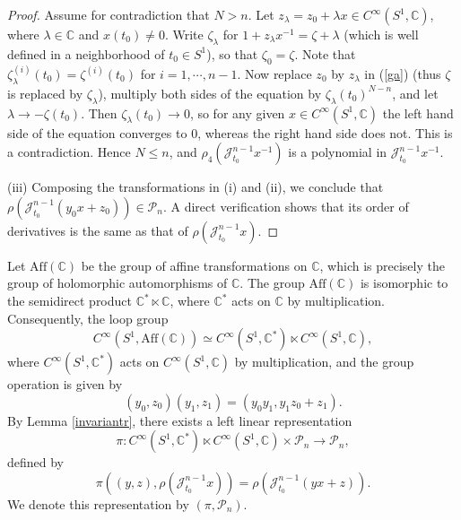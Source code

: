 \documentclass[11pt]{amsart}
\numberwithin{equation}{section}
\newcommand{\di}{\displaystyle}
\newcommand{\bc}{\mathbb{C}}
\newcommand{\sjm}{\mathscr{J}^{n-1}_{t_0}}
\newcommand{\cisoc}{C^{\infty}\left(S^1, \mathbb{C} \right)}
\newcommand{\cisoca}{C^{\infty}\left(S^1, \mathbb{C}^{\ast} \right)}
\newcommand{\pn}{\mathscr{P}_{n}}
\newcommand{\aff}{\mathrm{Aff}(\mathbb{C})}
\begin{document}
\begin{proof}
  Assume for contradiction that $N>n$.
  Let $z_{\lambda}=z_0+\lambda x \in \cisoc$, where $\lambda \in \bc$ and $x(t_0) \not=0$.
  Write $\zeta_{\lambda}$ for $1+z_{\lambda} x^{-1}=\zeta+\lambda$ (which is
  well defined in a neighborhood of $t_0 \in S^1$), so that $\zeta_0=\zeta$.
  Note that $\zeta_{\lambda}^{(i)}(t_0)=\zeta^{(i)}(t_0)$ for $i=1, \cdots, n-1$. Now
  replace $z_0$ by $z_{\lambda}$ in (\ref{ga})
  (thus $\zeta$ is replaced by $\zeta_{\lambda}$), multiply both sides
  of the equation by $\zeta_{\lambda}(t_0)^{N-n}$, and let $\lambda \to -\zeta(t_0)$.
  Then $\zeta_{\lambda}(t_0)\to0$, so for any given $x\in\cisoc$ the left hand side of the equation converges to $0$,
  whereas the right hand side does not.
  This is a contradiction.
  Hence $N \le n$, and $ \rho_4\left( \sjm x^{-1} \right)$ is a polynomial in $\sjm x^{-1}$.

  (iii) Composing the transformations in (i) and (ii), we conclude that $\rho(\sjm(y_0x+z_0)) \in \pn$. A direct verification shows that its order of derivatives is the same as that of $\di \rho(\sjm x)$.
\end{proof}

Let $\aff$ be the group of affine transformations on $\bc$, which is precisely
the group of holomorphic automorphisms of $\bc$.
The group $\aff$ is isomorphic to the semidirect product $\bc^{\ast} \ltimes \bc$,
where $\bc^{\ast}$ acts on $\bc$ by multiplication.
Consequently, the loop group
$$C^{\infty}(S^1, \aff) \simeq \cisoca \ltimes \cisoc,$$
where $\cisoca$ acts on $\cisoc$ by multiplication, and
the group operation is given by
$$(y_0, z_0)(y_1, z_1)=(y_0 y_1, y_1z_0+z_1).$$
By Lemma \ref{invariantr}, there exists a left linear representation
$$\pi: \cisoca \ltimes \cisoc \times \pn \to \pn, $$ defined by
\begin{equation*}
 \pi((y, z), \rho(\sjm x))=\rho( \sjm(yx+z)).
\end{equation*}
We denote this representation by $(\pi, \pn)$.
\end{document}
